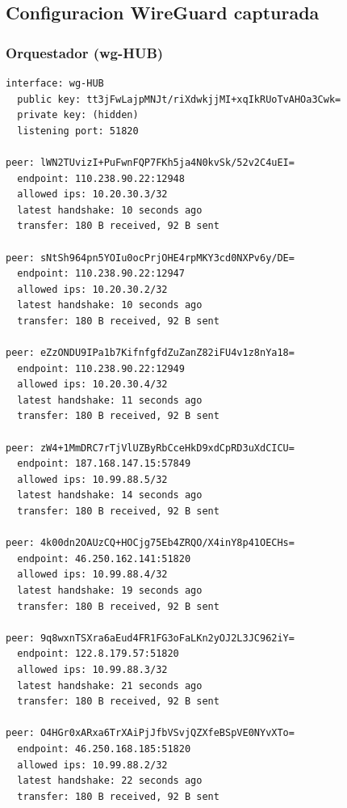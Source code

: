 \documentclass[11pt,a4paper]{article}
\begin{document}
\subsection{Configuracion WireGuard capturada}
\subsubsection*{Orquestador (wg-HUB)}
\begin{lstlisting}
interface: wg-HUB
  public key: tt3jFwLajpMNJt/riXdwkjjMI+xqIkRUoTvAHOa3Cwk=
  private key: (hidden)
  listening port: 51820

peer: lWN2TUvizI+PuFwnFQP7FKh5ja4N0kvSk/52v2C4uEI=
  endpoint: 110.238.90.22:12948
  allowed ips: 10.20.30.3/32
  latest handshake: 10 seconds ago
  transfer: 180 B received, 92 B sent

peer: sNtSh964pn5YOIu0ocPrjOHE4rpMKY3cd0NXPv6y/DE=
  endpoint: 110.238.90.22:12947
  allowed ips: 10.20.30.2/32
  latest handshake: 10 seconds ago
  transfer: 180 B received, 92 B sent

peer: eZzONDU9IPa1b7KifnfgfdZuZanZ82iFU4v1z8nYa18=
  endpoint: 110.238.90.22:12949
  allowed ips: 10.20.30.4/32
  latest handshake: 11 seconds ago
  transfer: 180 B received, 92 B sent

peer: zW4+1MmDRC7rTjVlUZByRbCceHkD9xdCpRD3uXdCICU=
  endpoint: 187.168.147.15:57849
  allowed ips: 10.99.88.5/32
  latest handshake: 14 seconds ago
  transfer: 180 B received, 92 B sent

peer: 4k00dn2OAUzCQ+HOCjg75Eb4ZRQO/X4inY8p41OECHs=
  endpoint: 46.250.162.141:51820
  allowed ips: 10.99.88.4/32
  latest handshake: 19 seconds ago
  transfer: 180 B received, 92 B sent

peer: 9q8wxnTSXra6aEud4FR1FG3oFaLKn2yOJ2L3JC962iY=
  endpoint: 122.8.179.57:51820
  allowed ips: 10.99.88.3/32
  latest handshake: 21 seconds ago
  transfer: 180 B received, 92 B sent

peer: O4HGr0xARxa6TrXAiPjJfbVSvjQZXfeBSpVE0NYvXTo=
  endpoint: 46.250.168.185:51820
  allowed ips: 10.99.88.2/32
  latest handshake: 22 seconds ago
  transfer: 180 B received, 92 B sent

\end{lstlisting}
\end{document}

